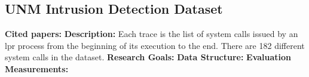\subsection{UNM Intrusion Detection Dataset}
\textbf{Cited papers:} \newline
\textbf{Description:} Each trace is the list of system calls issued by an lpr process from the beginning of its execution to the end. There are 182 different system calls in the dataset.\newline
\textbf{Research Goals:}  \newline
\textbf{Data Structure:} \newline
\textbf{Evaluation Measurements:} \newline

